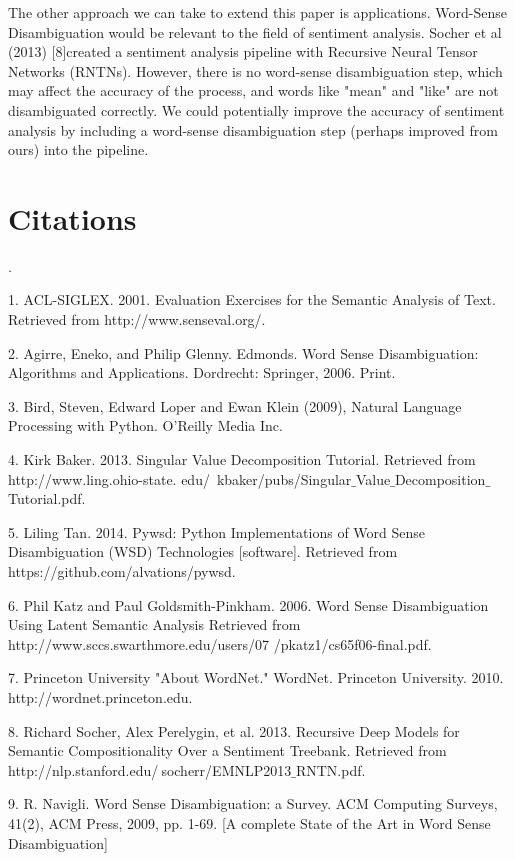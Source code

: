 \documentclass[10pt, letterpaper]{article}
\begin{document}
	The other approach we can take to extend this paper is applications. 
	Word-Sense Disambiguation would be relevant to the field of sentiment analysis. Socher et al (2013) [8]created a sentiment analysis pipeline with Recursive Neural Tensor Networks (RNTNs). However, there is no word-sense disambiguation step, which may affect the accuracy of the process, and words like "mean" and "like" are not disambiguated correctly. We could potentially improve the accuracy of sentiment analysis by including a word-sense disambiguation step (perhaps improved from ours) into the pipeline. 


	\section{Citations} 
	.

    1. ACL-SIGLEX. 2001. Evaluation Exercises for the Semantic Analysis of Text. Retrieved from http://www.senseval.org/.

	2. Agirre, Eneko, and Philip Glenny. Edmonds. Word Sense Disambiguation: Algorithms and Applications. Dordrecht: Springer, 2006. Print.

	3. Bird, Steven, Edward Loper and Ewan Klein (2009), Natural Language Processing with Python. O’Reilly Media Inc.

	4. Kirk Baker. 2013. Singular Value Decomposition Tutorial. Retrieved from http://www.ling.ohio-state. edu/~kbaker/pubs/Singular$\_$Value$\_$Decomposition$\_$Tutorial.pdf. 

    5. Liling Tan. 2014. Pywsd: Python Implementations of Word Sense Disambiguation (WSD) Technologies [software]. Retrieved from https://github.com/alvations/pywsd.

	6. Phil Katz and Paul Goldsmith-Pinkham. 2006. Word Sense Disambiguation Using Latent Semantic Analysis Retrieved from http://www.sccs.swarthmore.edu/users/07 /pkatz1/cs65f06-final.pdf.

	7. Princeton University "About WordNet." WordNet. Princeton University. 2010. http://wordnet.princeton.edu. 

    8. Richard Socher, Alex Perelygin, et al. 2013. Recursive Deep Models for Semantic Compositionality Over a Sentiment Treebank. Retrieved from http://nlp.stanford.edu/$~$socherr/EMNLP2013$\_$RNTN.pdf. 
      
	9. R. Navigli. Word Sense Disambiguation: a Survey. ACM Computing Surveys, 41(2), ACM Press, 2009, pp. 1-69. [A complete State of the Art in Word Sense Disambiguation] 
\end{document}
